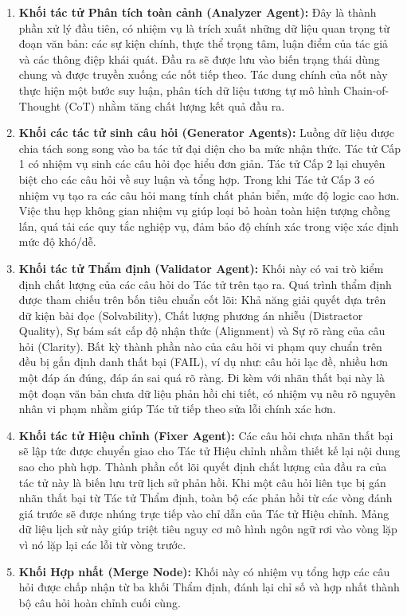 \begin{enumerate}

    \item \textbf{Khối tác tử Phân tích toàn cảnh (Analyzer Agent):} Đây là thành phần xử lý đầu tiên, có nhiệm vụ là trích xuất những dữ liệu quan trọng từ đoạn văn bản: các sự kiện chính, thực thể trọng tâm, luận điểm của tác giả và các thông điệp khái quát. Đầu ra sẽ được lưu vào biến trạng thái dùng chung và được truyền xuống các nốt tiếp theo. Tác dung chính của nốt này thực hiện một bước suy luận, phân tích dữ liệu tương tự mô hình Chain-of-Thought (CoT) nhằm tăng chất lượng kết quả đầu ra.

    \item \textbf{Khối các tác tử sinh câu hỏi (Generator Agents):} Luồng dữ liệu được chia tách song song vào ba tác tử đại diện cho ba mức nhận thức. Tác tử Cấp 1 có nhiệm vụ sinh các câu hỏi đọc hiểu đơn giản. Tác tử Cấp 2 lại chuyên biệt cho các câu hỏi về suy luận và tổng hợp. Trong khi Tác tử Cấp 3 có nhiệm vụ tạo ra các câu hỏi mang tính chất phản biển, mức độ logic cao hơn. Việc thu hẹp không gian nhiệm vụ giúp loại bỏ hoàn toàn hiện tượng chồng lấn, quá tải các quy tắc nghiệp vụ, đảm bảo độ chính xác trong việc xác định mức độ khó/dễ.

    \item \textbf{Khối tác tử Thẩm định (Validator Agent):} Khối này có vai trò kiểm định chất lượng của các câu hỏi do Tác tử trên tạo ra. Quá trình thẩm định được tham chiếu trên bốn tiêu chuẩn cốt lõi: Khả năng giải quyết dựa trên dữ kiện bài đọc (Solvability), Chất lượng phương án nhiễu (Distractor Quality), Sự bám sát cấp độ nhận thức (Alignment) và Sự rõ ràng của câu hỏi (Clarity). Bất kỳ thành phần nào của câu hỏi vi phạm quy chuẩn trên đều bị gắn định danh thất bại (FAIL), ví dụ như: câu hỏi lạc đề, nhiều hơn một đáp án đúng, đáp án sai quá rõ ràng. Đi kèm với nhãn thất bại này là một đoạn văn bản chưa dữ liệu phản hồi chi tiết, có nhiệm vụ nêu rõ nguyên nhân vi phạm nhằm giúp Tác tử tiếp theo sửa lỗi chính xác hơn.

    \item \textbf{Khối tác tử Hiệu chỉnh (Fixer Agent):} Các câu hỏi chưa nhãn thất bại sẽ lập tức được chuyển giao cho Tác tử Hiệu chỉnh nhằm thiết kế lại nội dung sao cho phù hợp. Thành phần cốt lõi quyết định chất lượng của đầu ra của tác tử này là biến lưu trữ lịch sử phản hồi. Khi một câu hỏi liên tục bị gán nhãn thất bại từ Tác tử Thẩm định, toàn bộ các phản hồi từ các vòng đánh giá trước sẽ được nhúng trực tiếp vào chỉ dẫn của Tác tử Hiệu chỉnh. Mảng dữ liệu lịch sử này giúp triệt tiêu nguy cơ mô hình ngôn ngữ rơi vào vòng lặp vì nó lặp lại các lỗi từ vòng trước.

    \item \textbf{Khối Hợp nhất (Merge Node):} Khối này có nhiệm vụ tổng hợp các câu hỏi được chấp nhận từ ba khối Thẩm định, đánh lại chỉ số và hợp nhất thành bộ câu hỏi hoàn chỉnh cuối cùng.
    
\end{enumerate}

